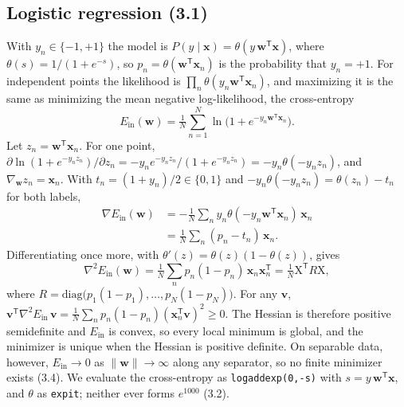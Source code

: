 \documentclass[conference]{IEEEtran}
\newcommand{\Ein}{E_{\mathrm{in}}}
\newcommand{\w}{\mathbf{w}}
\newcommand{\x}{\mathbf{x}}
\newcommand{\X}{\mathrm{X}}
\newcommand{\T}{^{\mathsf T}}
\begin{document}
\subsection{Logistic regression (3.1)}
With $y_n\in\{-1,+1\}$ the model is $P(y\mid\x)=\theta(y\,\w\T\x)$, where $\theta(s)=1/(1+e^{-s})$, so $p_n=\theta(\w\T\x_n)$ is the probability that $y_n=+1$. For independent points the likelihood is $\prod_n\theta(y_n\w\T\x_n)$, and maximizing it is the same as minimizing the mean negative log-likelihood, the cross-entropy
\begin{equation}
\Ein(\w)=\tfrac1N\sum_{n=1}^N\ln\big(1+e^{-y_n\w\T\x_n}\big).\label{eq:ce}
\end{equation}
Let $z_n=\w\T\x_n$. For one point, $\partial\ln(1+e^{-y_nz_n})/\partial z_n=-y_ne^{-y_nz_n}/(1+e^{-y_nz_n})=-y_n\theta(-y_nz_n)$, and $\nabla_\w z_n=\x_n$. With $t_n=(1+y_n)/2\in\{0,1\}$ and $-y_n\theta(-y_nz_n)=\theta(z_n)-t_n$ for both labels,
\begin{equation}
\begin{aligned}
\nabla\Ein(\w)&=-\tfrac1N\textstyle\sum_n y_n\theta(-y_n\w\T\x_n)\,\x_n\\
&=\tfrac1N\textstyle\sum_n(p_n-t_n)\,\x_n.
\end{aligned}\label{eq:grad}
\end{equation}
Differentiating once more, with $\theta'(z)=\theta(z)(1-\theta(z))$, gives
\begin{equation}
\nabla^2\Ein(\w)=\tfrac1N\textstyle\sum_n p_n(1-p_n)\,\x_n\x_n\T=\tfrac1N\X\T R\X,\label{eq:hess}
\end{equation}
where $R=\mathrm{diag}\big(p_1(1-p_1),\dots,p_N(1-p_N)\big)$. For any $\mathbf v$, $\mathbf v\T\nabla^2\Ein\,\mathbf v=\frac1N\sum_n p_n(1-p_n)(\x_n\T\mathbf v)^2\ge0$. The Hessian is therefore positive semidefinite and $\Ein$ is convex, so every local minimum is global, and the minimizer is unique when the Hessian is positive definite. On separable data, however, $\Ein\to0$ as $\lVert\w\rVert\to\infty$ along any separator, so no finite minimizer exists (3.4). We evaluate the cross-entropy as \texttt{logaddexp(0,-s)} with $s=y\,\w\T\x$, and $\theta$ as \texttt{expit}; neither ever forms $e^{1000}$ (3.2).
\end{document}
